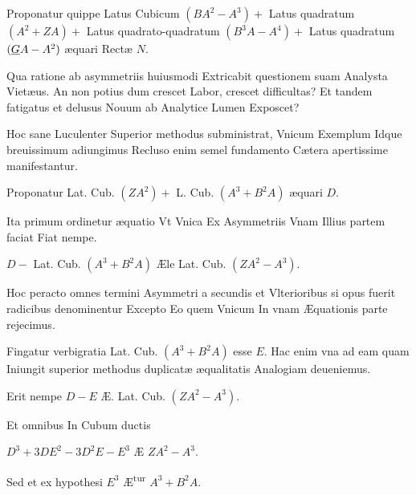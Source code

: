 \documentclass[11pt,a4paper]{article}
\begin{document}
Proponatur quippe Latus Cubicum $(BA^2 - A^3) +$ Latus quadratum $(A^2 + ZA) +$ Latus quadrato-quadratum $(B^3A - A^4) +$ Latus quadratum $(\uncertain{G}A - A^2)$ æquari Rectæ $N$.

Qua ratione ab asymmetriis huiusmodi Extricabit  questionem suam Analysta Vietæus. An non potius dum crescet Labor, crescet difficultas? Et tandem fatigatus et delusus Nouum ab Analytice Lumen Exposcet?

Hoc sane Luculenter Superior methodus subministrat, Vnicum Exemplum Idque breuissimum adiungimus Recluso enim semel fundamento Cætera apertissime manifestantur.

Proponatur Lat. Cub. $(ZA^2) +$ L. Cub. $(A^3 + B^2A)$ æquari $D$.

Ita primum ordinetur æquatio Vt Vnica Ex Asymmetriis Vnam Illius partem faciat Fiat nempe.

$D -$ Lat. Cub. $(A^3 + B^2A)$ Æle Lat. Cub. $(ZA^2 - A^3)$.

Hoc peracto omnes termini Asymmetri a secundis et Vlterioribus si opus fuerit radicibus denominentur Excepto Eo quem Vnicum In vnam Æquationis parte rejecimus.


Fingatur verbigratia Lat. Cub. $(A^3 + B^2A)$ esse $E$. Hac enim vna ad eam quam Iniungit superior methodus duplicatæ æqualitatis Analogiam deueniemus.

Erit nempe $D - E$ Æ. Lat. Cub. $(ZA^2 - A^3)$.

Et omnibus In Cubum ductis

$D^3 + 3DE^2 - 3D^2E - E^3$ Æ $ZA^2 - A^3$.

Sed et ex hypothesi $E^3$ Æ\textsuperscript{tur} $A^3 + B^2A$.
\end{document}
